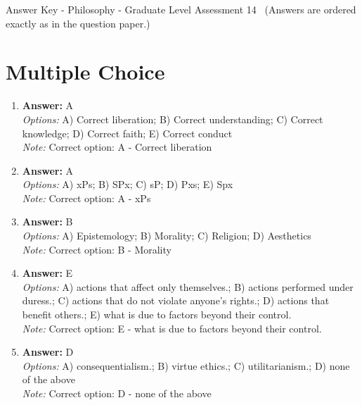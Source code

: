 \documentclass[12pt]{article}
\begin{document}
\begin{center}
Answer Key - Philosophy - Graduate Level Assessment 14 \
\small (Answers are ordered exactly as in the question paper.)
\end{center}

\section*{Multiple Choice}
\begin{enumerate}[label=\arabic*.]
\item \textbf{Answer:} A
\\ \textit{Options:} A) Correct liberation; B) Correct understanding; C) Correct knowledge; D) Correct faith; E) Correct conduct
\\ \textit{Note:} Correct option: A - Correct liberation
\item \textbf{Answer:} A
\\ \textit{Options:} A) xPs; B) SPx; C) sP; D) Pxs; E) Spx
\\ \textit{Note:} Correct option: A - xPs
\item \textbf{Answer:} B
\\ \textit{Options:} A) Epistemology; B) Morality; C) Religion; D) Aesthetics
\\ \textit{Note:} Correct option: B - Morality
\item \textbf{Answer:} E
\\ \textit{Options:} A) actions that affect only themselves.; B) actions performed under duress.; C) actions that do not violate anyone's rights.; D) actions that benefit others.; E) what is due to factors beyond their control.
\\ \textit{Note:} Correct option: E - what is due to factors beyond their control.
\item \textbf{Answer:} D
\\ \textit{Options:} A) consequentialism.; B) virtue ethics.; C) utilitarianism.; D) none of the above
\\ \textit{Note:} Correct option: D - none of the above
\end{enumerate}
\end{document}
